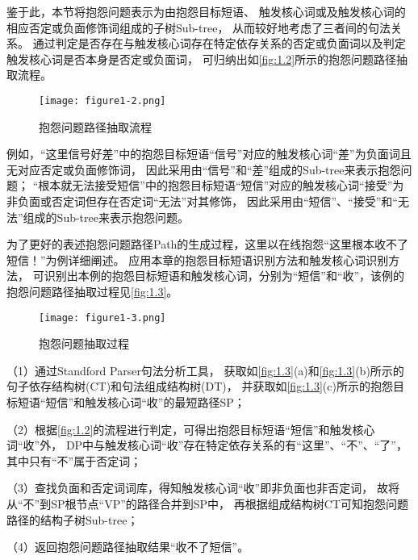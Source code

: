 鉴于此，本节将抱怨问题表示为由抱怨目标短语、
触发核心词或及触发核心词的相应否定或负面修饰词组成的子树Sub-tree，
从而较好地考虑了三者间的句法关系。
通过判定是否存在与触发核心词存在特定依存关系的否定或负面词以及判定触发核心词是否本身是否定或负面词，
可归纳出如\autoref{fig:1.2}所示的抱怨问题路径抽取流程。

\begin{figure}[th]
    
    \centering
    \texttt{[image: figure1-2.png]}
    \vskip -20pt
    \caption{抱怨问题路径抽取流程}\label{fig:1.2}
\end{figure}

例如，“这里信号好差”中的抱怨目标短语“信号”对应的触发核心词“差”为负面词且无对应否定或负面修饰词，
因此采用由“信号”和“差”组成的Sub-tree来表示抱怨问题；
“根本就无法接受短信”中的抱怨目标短语“短信”对应的触发核心词“接受”为非负面或否定词但存在否定词“无法”对其修饰，
因此采用由“短信”、“接受”和“无法”组成的Sub-tree来表示抱怨问题。

为了更好的表述抱怨问题路径Path的生成过程，这里以在线抱怨“这里根本收不了短信！”为例详细阐述。
应用本章的抱怨目标短语识别方法和触发核心词识别方法，
可识别出本例的抱怨目标短语和触发核心词，分别为“短信”和“收”，该例的抱怨问题路径抽取过程见\autoref{fig:1.3}。

\begin{figure}[th]
    
    \centering
    \texttt{[image: figure1-3.png]}
    \vskip -20pt
    \caption{抱怨问题抽取过程}\label{fig:1.3}
\end{figure}

（1）通过Standford Parser句法分析工具，
获取如\autoref{fig:1.3}(a)和\autoref{fig:1.3}(b)所示的句子依存结构树(CT)和句法组成结构树(DT)，
并获取如\autoref{fig:1.3}(c)所示的抱怨目标短语“短信”和触发核心词“收”的最短路径SP；

（2）根据\autoref{fig:1.2}的流程进行判定，可得出抱怨目标短语“短信”和触发核心词“收”外，
DP中与触发核心词“收”存在特定依存关系的有“这里”、“不”、“了”，其中只有“不”属于否定词；

（3）查找负面和否定词词库，得知触发核心词“收”即非负面也非否定词，
故将从“不”到SP根节点“VP”的路径合并到SP中，
再根据组成结构树CT可知抱怨问题路径的结构子树Sub-tree；

（4）返回抱怨问题路径抽取结果“收不了短信”。


